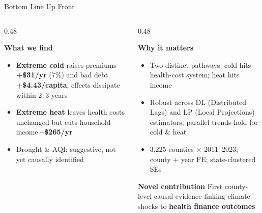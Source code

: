 \documentclass[aspectratio=169,11pt]{beamer}
\newcommand{\emphcolor}[1]{{\color{WarmOrange}\textbf{#1}}}
\newcommand{\tealtext}[1]{{\color{Teal}#1}}
\newcommand{\navytext}[1]{{\color{DeepNavy}#1}}
\begin{document}
\begin{frame}{Bottom Line Up Front}
  \begin{columns}[T]
    \begin{column}{0.48\textwidth}
      \begin{block}{\textbf{What we find}}
        \small\begin{itemize}\itemsep0.3em
          \item \emphcolor{Extreme cold} raises premiums \emphcolor{+\$31/yr} (7\%) and bad debt \emphcolor{+\$4.43/capita}; effects dissipate within 2--3 years
          \item \emphcolor{Extreme heat} leaves health costs unchanged but cuts household income \emphcolor{--\$265/yr}
          \item Drought \& AQI: \navytext{suggestive, not yet causally identified}
        \end{itemize}
      \end{block}
    \end{column}
    \begin{column}{0.48\textwidth}
      \begin{exampleblock}{\textbf{Why it matters}}
        \small\begin{itemize}\itemsep0.3em
          \item \tealtext{Two distinct pathways}: cold hits health-cost system; heat hits income
          \item Robust across DL (Distributed Lags) and LP (Local Projections) estimators; parallel trends hold for cold \& heat
          \item 3,225 counties $\times$ 2011--2023; county + year FE; state-clustered SEs
        \end{itemize}
      \end{exampleblock}
      \vspace{0.25em}
      \begin{alertblock}{\textbf{Novel contribution}}
        \small First county-level causal evidence linking climate shocks to \emphcolor{health finance outcomes}
      \end{alertblock}
    \end{column}
  \end{columns}
\end{frame}
\end{document}
